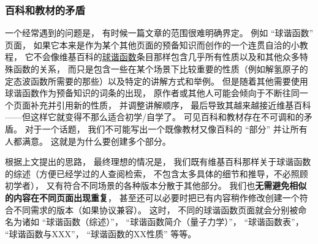 




\subsubsection{百科和教材的矛盾}
一个经常遇到的问题是， 有时候一篇文章的范围很难明确界定。 例如 “球谐函数” 页面， 如果它本来是作为某个其他页面的预备知识而创作的一个连贯自洽的小教程， 它不会像维基百科的\href{https://en.wikipedia.org/wiki/Spherical_harmonics}{球谐函数}条目那样包含几乎所有性质以及和其他众多特殊函数的关系， 而只是包含一些在某个场景下比较重要的性质（例如解氢原子的定态波函数所需要的那些）以及特定的讲解方式和举例。 但是随着其他需要使用球谐函数作为预备知识的词条的出现， 原作者或其他人可能会倾向于不断往同一个页面补充并引用新的性质， 并调整讲解顺序， 最后导致其越来越接近维基百科——但这样它就变得不那么适合初学/自学了。 可见百科和教材存在不可调和的矛盾。 对于一个话题， 我们不可能写出一个既像教材又像百科的 “部分” 并让所有人都满意。 这就是为什么要创建多个部分。

根据上文提出的思路， 最终理想的情况是， 我们既有维基百科那样关于球谐函数的综述（方便已经学过的人查阅检索， 不包含太多具体的细节和推导，不必照顾初学者）， 又有符合不同场景的各种版本分散于其他部分。 我们也\textbf{无需避免相似的内容在不同页面出现重复}， 甚至还可以必要时把已有内容稍作修改创建一个符合不同需求的版本（如果协议兼容）。 这时， 不同的球谐函数页面就会分别被命名为诸如 “球谐函数（综述）”， “球谐函数简介（量子力学）”， “球谐函数表”， “球谐函数与XXX”， “球谐函数的XX性质” 等等。

